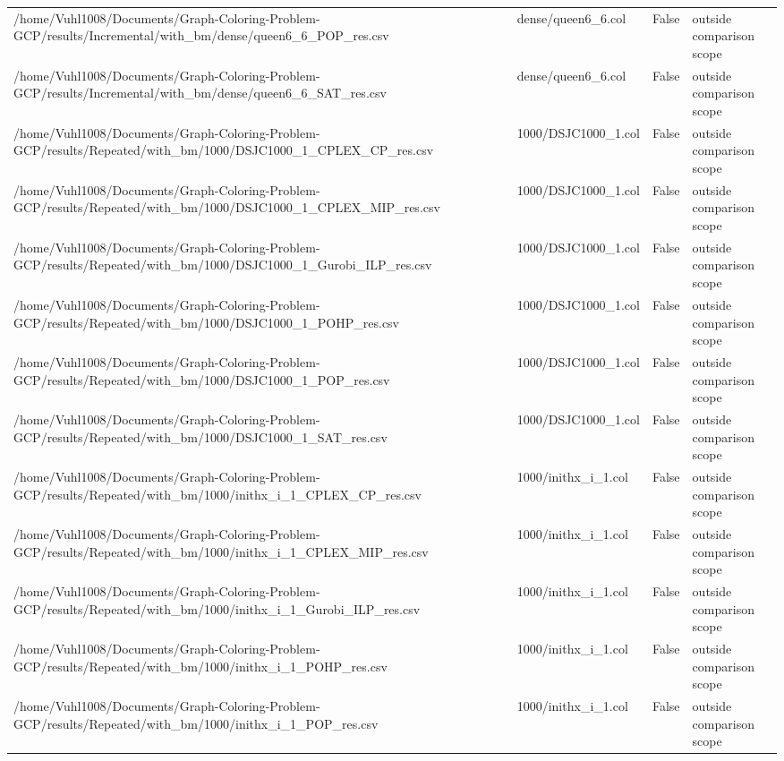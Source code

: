 \begin{table}[htbp]
\begin{tabular}{llll}
/home/Vuhl1008/Documents/Graph-Coloring-Problem-GCP/results/Incremental/with\_bm/dense/queen6\_6\_POP\_res.csv & dense/queen6\_6.col & False & outside comparison scope \\
/home/Vuhl1008/Documents/Graph-Coloring-Problem-GCP/results/Incremental/with\_bm/dense/queen6\_6\_SAT\_res.csv & dense/queen6\_6.col & False & outside comparison scope \\
/home/Vuhl1008/Documents/Graph-Coloring-Problem-GCP/results/Repeated/with\_bm/1000/DSJC1000\_1\_CPLEX\_CP\_res.csv & 1000/DSJC1000\_1.col & False & outside comparison scope \\
/home/Vuhl1008/Documents/Graph-Coloring-Problem-GCP/results/Repeated/with\_bm/1000/DSJC1000\_1\_CPLEX\_MIP\_res.csv & 1000/DSJC1000\_1.col & False & outside comparison scope \\
/home/Vuhl1008/Documents/Graph-Coloring-Problem-GCP/results/Repeated/with\_bm/1000/DSJC1000\_1\_Gurobi\_ILP\_res.csv & 1000/DSJC1000\_1.col & False & outside comparison scope \\
/home/Vuhl1008/Documents/Graph-Coloring-Problem-GCP/results/Repeated/with\_bm/1000/DSJC1000\_1\_POHP\_res.csv & 1000/DSJC1000\_1.col & False & outside comparison scope \\
/home/Vuhl1008/Documents/Graph-Coloring-Problem-GCP/results/Repeated/with\_bm/1000/DSJC1000\_1\_POP\_res.csv & 1000/DSJC1000\_1.col & False & outside comparison scope \\
/home/Vuhl1008/Documents/Graph-Coloring-Problem-GCP/results/Repeated/with\_bm/1000/DSJC1000\_1\_SAT\_res.csv & 1000/DSJC1000\_1.col & False & outside comparison scope \\
/home/Vuhl1008/Documents/Graph-Coloring-Problem-GCP/results/Repeated/with\_bm/1000/inithx\_i\_1\_CPLEX\_CP\_res.csv & 1000/inithx\_i\_1.col & False & outside comparison scope \\
/home/Vuhl1008/Documents/Graph-Coloring-Problem-GCP/results/Repeated/with\_bm/1000/inithx\_i\_1\_CPLEX\_MIP\_res.csv & 1000/inithx\_i\_1.col & False & outside comparison scope \\
/home/Vuhl1008/Documents/Graph-Coloring-Problem-GCP/results/Repeated/with\_bm/1000/inithx\_i\_1\_Gurobi\_ILP\_res.csv & 1000/inithx\_i\_1.col & False & outside comparison scope \\
/home/Vuhl1008/Documents/Graph-Coloring-Problem-GCP/results/Repeated/with\_bm/1000/inithx\_i\_1\_POHP\_res.csv & 1000/inithx\_i\_1.col & False & outside comparison scope \\
/home/Vuhl1008/Documents/Graph-Coloring-Problem-GCP/results/Repeated/with\_bm/1000/inithx\_i\_1\_POP\_res.csv & 1000/inithx\_i\_1.col & False & outside comparison scope \\

\end{tabular}
\end{table}
